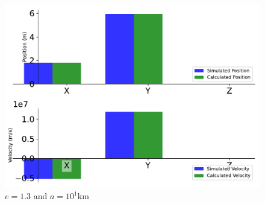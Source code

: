 \begin{figure}[htbp]\centerline{\includegraphics[height=0.7\textwidth, keepaspectratio]{AutoTeX/EquHyp_a_1}}\caption{$e = 1.3$ and $a = 10^1$km}\label{fig:EquHyp_a_1}\end{figure}